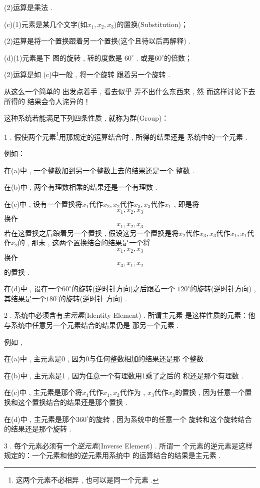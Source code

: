 (2)运算是乘法 . 

(c)(1)元素是某几个文字(如$x_1 , x_2 , x_3$)的置换(Substitution)；

(2)运算是将一个置换跟着另一个置换(这个且待以后再解释) . 

(d)(1)元素是下 图的旋转 , 转的度数是 $60^{\circ}$ . 或是$60^{\circ}$的倍数；

(2)运算是如 (c)中一般 , 将一个旋转 跟着另一个旋转 . 

从这么一个简单的 出发点着手 , 看去似乎 弄不出什么东西来 , 然 而这样讨论下去所得的 结果会令人诧异的！

这种系统若能满足下列四条性质 , 就称为群(Group)：

1 . 假使两个元素\footnote{这两个元素不必相异 , 也可以是同一个元素 . }用那规定的运算结合时 , 所得的结果还是 系统中的一个元素 . 

例如：

在(a)中 , 一个整数加到另一个整数上去的结果还是一个 整数 . 

在(b)中 , 两个有理数相乘的结果还是一个有理数 . 

在(c)中 , 设有一个置换将$x_1$代作$x_2 , x_2$代作$x_3 , x_3$代作$x_1$ , 即是将
\[x_1 , x_2 , x_3\]
换作
\[x_1 , x_2 , x_3\]
若在这置换之后踉着另一个置换 , 假设这另一个置换是将$x_2$代作$x_3 , x_3$代作$x_1 , x_1$代作$x_2$的 , 那末 , 这两个置换结合的结果是一个将
\[x_1 , x_2 , x_3\]
换作
\[x_3 , x_1 , x_2\]
的置换 . 

在(d)中 , 设在一个$60^{\circ}$的旋转(逆时针方向)之后跟着一个 $120^{\circ}$的旋转(逆时针方向) , 其结果是一个$180^{\circ}$的旋转(逆时针 方向) . 

2 . 系统中必须含有\emph{主元素}(Identity Element) . 所谓主元素 是这样性质的元素：他与系统中任意另一个元素结合的结果仍是 那另一个元素 . 

例如 , 

在(a)中 , 主元素是0 , 因为0与任何整数相加的结果还是那 个整数 . 

在(b)中 , 主元素是1 , 因为任意一个有理数用1乘了之后的 积还是那个有理数 . 

在(c)中 , 主元素是那个将$x_1$代作$x_1 , x_2$代作为 , $x_3$代作$x_3$的置换 , 因为任意一个置换和这个置换结合的结果还是那个置换 . 

在(d)中 , 主元素是那个$360^{\circ}$的旋转 , 因为系统中的任意一个 旋转和这个旋转结合的结果还是那个旋转 . 

3 . 每个元素必须有一个\emph{逆元素}(Inverse Element) . 所谓一 个元素的逆元素是这样规定的：一个元素和他的逆元素用系统中 的运算结合的结果是主元素 . 

